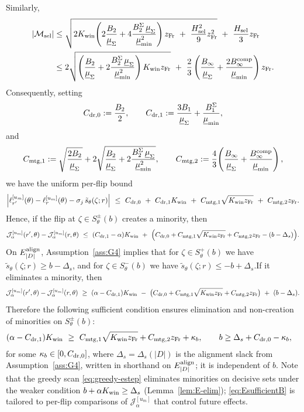 \documentclass{statsoc}
\newcommand{\1}{\mathbbm{1}}
\begin{document}
Similarly,
\begin{align}
|\mathcal M_{\rm sel}|
&\le \sqrt{ 2K_{\rm win}\!\left(2\frac{B_2}{\underline\mu_\Sigma} + 4\frac{B_2^\Sigma\,\underline\mu_\Sigma}{\underline\mu_{\min}^2}\right) z_{\rm Fr}\ +\ \frac{H_{\rm sel}^2}{9}z_{\rm Fr}^2 }\ +\ \frac{H_{\rm sel}}{3}z_{\rm Fr}\notag\\
&\le 2\sqrt{\left(\frac{B_2}{\underline\mu_\Sigma} + 2\frac{B_2^\Sigma\,\underline\mu_\Sigma}{\underline\mu_{\min}^2}\right)K_{\rm win} z_{\rm Fr}}\ +\ \frac{2}{3}\left(\frac{B_\infty}{\underline\mu_\Sigma} + \frac{2B_\infty^{\rm comp}}{\underline\mu_{\min}}\right)z_{\rm Fr}.
\label{eq:mtgsel-bnd}
\end{align}
Consequently, setting
\[
C_{\rm dr,0}:=\frac{B_2}{2},\qquad
C_{\rm dr,1}:=\frac{3B_1}{\underline\mu_\Sigma}+\frac{B_1^{\Sigma}}{\underline\mu_{\min}},
\]
and
\[
C_{\rm mtg,1}:=\sqrt{\frac{2B_2}{\underline\mu_\Sigma}} + 2\sqrt{\frac{B_2}{\underline\mu_\Sigma}+2\frac{B_2^{\Sigma}\,\underline\mu_\Sigma}{\underline\mu_{\min}^2}},\qquad
C_{\rm mtg,2}:=\frac{4}{3}\!\left(\frac{B_\infty}{\underline\mu_\Sigma}+\frac{B_\infty^{\rm comp}}{\underline\mu_{\min}}\right),
\]
we have the uniform per-flip bound
\begin{equation}\label{eq:perflip-bound}
\Big|\ell_{r'}^{[u_m]}(\theta)-\ell_r^{[u_m]}(\theta)-\sigma_j\,\tilde s_\theta(\zeta;r)\Big|
\ \le\ C_{\rm dr,0}\ +\ C_{\rm dr,1} K_{\rm win}\ +\ C_{\rm mtg,1}\sqrt{K_{\rm win} z_{\rm Fr}}\ +\ C_{\rm mtg,2} z_{\rm Fr}.
\end{equation}
Hence, if the flip at $\zeta\in S_\theta^\pm(b)$ creates a minority, then
\[
\mathcal J_\alpha^{[u_m]}(r',\theta)-\mathcal J_\alpha^{[u_m]}(r,\theta)\ \le\ (C_{\rm dr,1}-\alpha) K_{\rm win}\ +\ \Big(C_{\rm dr,0}+C_{\rm mtg,1}\sqrt{K_{\rm win}z_{\rm Fr}}+C_{\rm mtg,2}z_{\rm Fr}-(b-\Delta_s)\Big).
\]
On \(E^{\rm align}_{|D|}\), Assumption~\ref{ass:G4} implies that for \(\zeta\in S_\theta^+(b)\) we have \(\tilde s_\theta(\zeta;r)\ge b-\Delta_s\), and for \(\zeta\in S_\theta^-(b)\) we have \(\tilde s_\theta(\zeta;r)\le -b+\Delta_s\).If it eliminates a minority, then
\[
\mathcal J_\alpha^{[u_m]}(r',\theta)-\mathcal J_\alpha^{[u_m]}(r,\theta)\ \ge\ (\alpha-C_{\rm dr,1}) K_{\rm win}\ -\ \big(C_{\rm dr,0}+C_{\rm mtg,1}\sqrt{K_{\rm win}z_{\rm Fr}}+C_{\rm mtg,2}z_{\rm Fr}\big)\ +\ (b-\Delta_s).
\]
Therefore the following sufficient condition ensures elimination and non-creation of minorities on $S_\theta^\pm(b)$:
\begin{align}
&(\alpha-C_{\rm dr,1}) K_{\rm win}\ \ge\ C_{\rm mtg,1}\sqrt{K_{\rm win}z_{\rm Fr}}+C_{\rm mtg,2}z_{\rm Fr}+\kappa_b,\qquad
b \ge \Delta_s + C_{\rm dr,0} - \kappa_b,\label{eq:EsufficientB}
\end{align}
for some \(\kappa_b\in[0,C_{\rm dr,0}]\), where \(\Delta_s=\Delta_s(|D|)\) is the alignment slack from Assumption~\ref{ass:G4}, written in shorthand on \(E^{\rm align}_{|D|}\); it is independent of \(b\). Note that the greedy scan \eqref{eq:greedy-estep} eliminates minorities on decisive sets under the weaker condition \(b+\alpha K_{\rm win}\ge \Delta_s\) (Lemma~\ref{lem:E-elim}); \eqref{eq:EsufficientB} is tailored to per-flip comparisons of \(\mathcal J_\alpha^{[u_m]}\) that control future effects.
\end{document}
